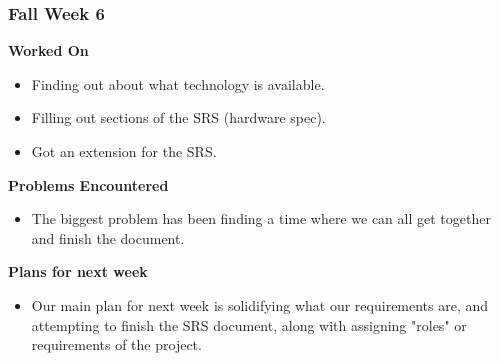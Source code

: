 \documentclass[compsoc,draftclsnofoot,onecolumn,10pt]{IEEEtran}
\begin{document}
\subsubsection*{Fall Week 6}
\textbf{Worked On}
\begin{itemize}
    \item Finding out about what technology is available. 
    \item Filling out sections of the SRS (hardware spec).
    \item Got an extension for the SRS.
\end{itemize}
\textbf{Problems Encountered}
\begin{itemize}
    \item The biggest problem has been finding a time where we can all get together and finish the document.
\end{itemize}
\textbf{Plans for next week}
\begin{itemize}
    \item Our main plan for next week is solidifying what our requirements are, and attempting to finish the SRS document, along with assigning "roles" or requirements of the project.
\end{itemize}
    
    
\end{document}
